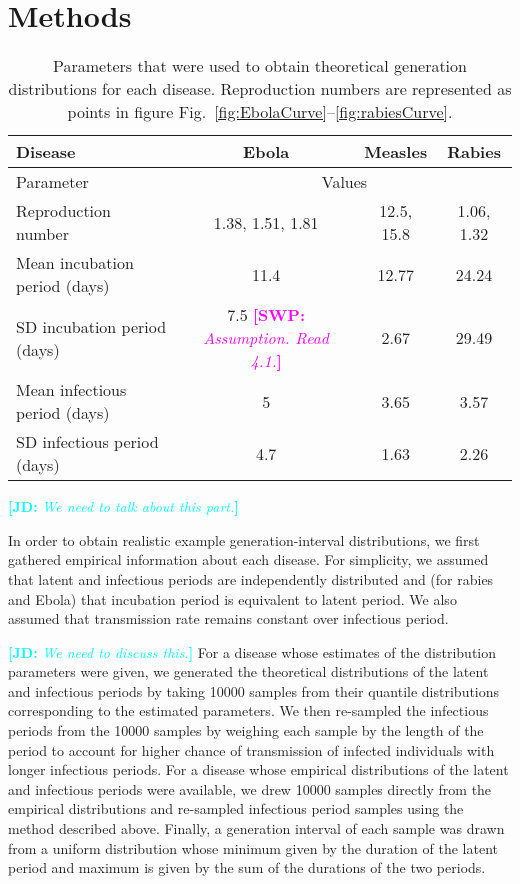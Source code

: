 \documentclass[12pt,]{article}
\newcommand{\frange}[2]{Fig.~\ref{fig:#1}--\ref{fig:#2}}
\newcommand{\tlab}[1]{\label{tab:#1}}
\newcommand{\comment}[3]{\textcolor{#1}{\textbf{[#2: }\textit{#3}\textbf{]}}}
\newcommand{\jd}[1]{\comment{cyan}{JD}{#1}}
\newcommand{\swp}[1]{\comment{magenta}{SWP}{#1}}
\begin{document}
\section{Methods}

\begin{table}[h!]
\centering
\begin{tabular}{l*{3}{c}}
\hline
Disease & Ebola & Measles & Rabies\\
\hline
Parameter & \multicolumn{3}{c}{Values}\\
\hline
Reproduction number & 1.38, 1.51, 1.81 \cite{WHO14} & 12.5, 15.8 \cite{AndeMay82} & 1.06, 1.32 \cite{HampDush09} \\
Mean incubation period (days) & 11.4 \cite{WHO14} & 12.77 \cite{LessReic09inc}  & 24.24 \cite{HampDush09} \\
SD incubation period (days) & 7.5 \swp{Assumption. Read 4.1.} & 2.67 \cite{LessReic09inc} & 29.49 \cite{HampDush09} \\
Mean infectious period (days) & 5 \cite{WHO14} & 3.65 \cite{Lloy01} & 3.57 \cite{HampDush09} \\
SD infectious period (days) & 4.7 \cite{WHO14} & 1.63 \cite{Lloy01} & 2.26 \cite{HampDush09}
\end{tabular}
\caption{Parameters that were used to obtain theoretical generation distributions for each disease. Reproduction numbers are represented as points in figure \frange{EbolaCurve}{rabiesCurve}.}
\tlab{parameters}
\end{table}

\jd{We need to talk about this part.}

In order to obtain realistic example generation-interval distributions, we first gathered empirical information about each disease. For simplicity, we assumed that latent and infectious periods are independently distributed and (for rabies and Ebola) that incubation period is equivalent to latent period. We also assumed that transmission rate remains constant over infectious period.

\jd{We need to discuss this.}
For a disease whose estimates of the distribution parameters were given, we generated the theoretical distributions of the latent and infectious periods by taking 10000 samples from their quantile distributions corresponding to the estimated parameters. We then re-sampled the infectious periods from the 10000 samples by weighing each sample by the length of the period to account for higher chance of transmission of infected individuals with longer infectious periods. 
For a disease whose empirical distributions of the latent and infectious periods were available, we drew 10000 samples directly from the empirical distributions and re-sampled infectious period samples using the method described above.
Finally, a generation interval of each sample was drawn from a uniform distribution whose minimum given by the duration of the latent period and maximum is given by the sum of the durations of the two periods.
\end{document}
